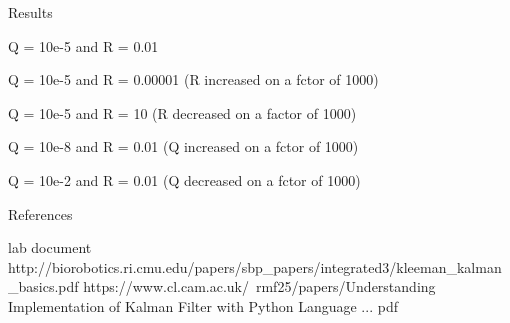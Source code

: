 \documentclass{article}
\begin{document}
Results

Q = 10e-5 and R = 0.01

Q = 10e-5 and R = 0.00001 (R increased on a fctor of 1000)

Q = 10e-5 and R = 10 (R decreased on a factor of 1000)

Q = 10e-8 and R = 0.01 (Q increased on a fctor of 1000)

Q = 10e-2 and R = 0.01 (Q decreased on a fctor of 1000)

References

lab document
http://biorobotics.ri.cmu.edu/papers/sbp_papers/integrated3/kleeman_kalman_basics.pdf
https://www.cl.cam.ac.uk/~rmf25/papers/Understanding%
Implementation of Kalman Filter with Python Language ... pdf
\end{document}
